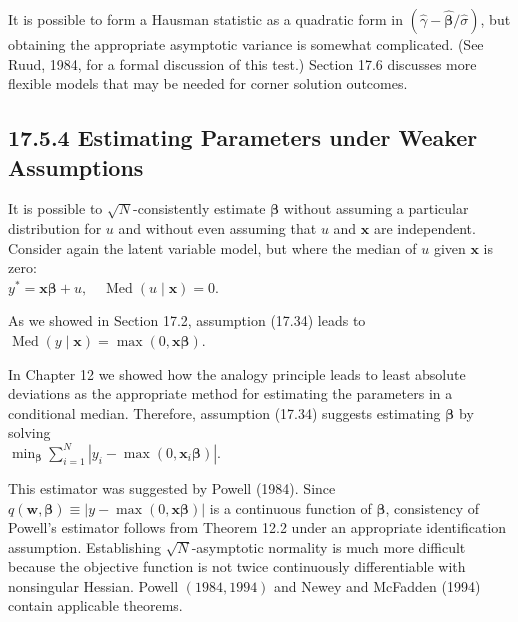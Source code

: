 \documentclass[10pt]{article}
\begin{document}
It is possible to form a Hausman statistic as a quadratic form in $(\hat{\gamma}-\hat{\boldsymbol{\beta}} / \hat{\sigma})$, but obtaining the appropriate asymptotic variance is somewhat complicated. (See Ruud, 1984, for a formal discussion of this test.) Section 17.6 discusses more flexible models that may be needed for corner solution outcomes.

\subsection*{17.5.4 Estimating Parameters under Weaker Assumptions}
It is possible to $\sqrt{N}$-consistently estimate $\boldsymbol{\beta}$ without assuming a particular distribution for $u$ and without even assuming that $u$ and $\mathbf{x}$ are independent. Consider again the latent variable model, but where the median of $u$ given $\mathbf{x}$ is zero:\\
$y^{*}=\mathbf{x} \boldsymbol{\beta}+u, \quad \operatorname{Med}(u \mid \mathbf{x})=0$.

As we showed in Section 17.2, assumption (17.34) leads to\\
$\operatorname{Med}(y \mid \mathbf{x})=\max (0, \mathbf{x} \boldsymbol{\beta})$.

In Chapter 12 we showed how the analogy principle leads to least absolute deviations as the appropriate method for estimating the parameters in a conditional median. Therefore, assumption (17.34) suggests estimating $\boldsymbol{\beta}$ by solving\\
$\min _{\boldsymbol{\beta}} \sum_{i=1}^{N}\left|y_{i}-\max \left(0, \mathbf{x}_{i} \boldsymbol{\beta}\right)\right|$.

This estimator was suggested by Powell (1984). Since $q(\mathbf{w}, \boldsymbol{\beta}) \equiv|y-\max (0, \mathbf{x} \boldsymbol{\beta})|$ is a continuous function of $\boldsymbol{\beta}$, consistency of Powell's estimator follows from Theorem 12.2 under an appropriate identification assumption. Establishing $\sqrt{N}$-asymptotic normality is much more difficult because the objective function is not twice continuously differentiable with nonsingular Hessian. Powell $(1984,1994)$ and Newey and McFadden (1994) contain applicable theorems.
\end{document}
